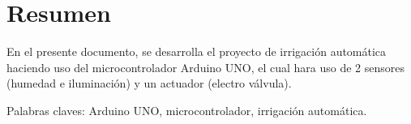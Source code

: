 \section*{Resumen}
En el presente documento, se desarrolla el proyecto de irrigaci\'on autom\'atica
haciendo uso del microcontrolador Arduino UNO, el cual hara
uso de 2 sensores (humedad e iluminación) y un actuador (electro v\'alvula).

Palabras claves: Arduino UNO, microcontrolador, irrigaci\'on autom\'atica.